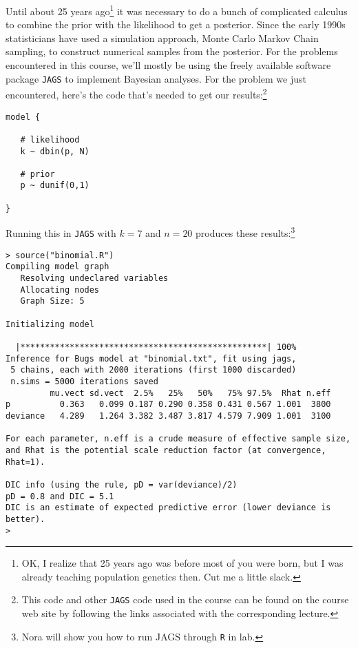 Until about 25 years ago\footnote{OK, I realize that 25 years ago was
  before most of you were born, but I was already teaching population
  genetics then. Cut me a little slack.} it was necessary to do a
bunch of complicated calculus to combine the prior with the likelihood
to get a posterior. Since the early 1990s statisticians have used a
simulation approach, Monte Carlo Markov Chain sampling, to construct
numerical samples from the posterior. For the problems encountered in
this course, we'll mostly be using the freely available software
package {\tt JAGS} to implement Bayesian analyses. For the problem
we just encountered, here's the code that's needed to get our
results:\footnote{This code and other {\tt JAGS} code used in the
  course can be found on the course web site by following the links
  associated with the corresponding
  lecture.}
\begin{verbatim}
model {

   # likelihood
   k ~ dbin(p, N)

   # prior
   p ~ dunif(0,1)

}
\end{verbatim}
Running this in {\tt JAGS} with $k=7$ and $n=20$ produces these
results:\footnote{Nora will show you how to run JAGS through {\tt R}
  in lab.}
\begin{verbatim}
> source("binomial.R")
Compiling model graph
   Resolving undeclared variables
   Allocating nodes
   Graph Size: 5

Initializing model

  |**************************************************| 100%
Inference for Bugs model at "binomial.txt", fit using jags,
 5 chains, each with 2000 iterations (first 1000 discarded)
 n.sims = 5000 iterations saved
         mu.vect sd.vect  2.5%   25%   50%   75% 97.5%  Rhat n.eff
p          0.363   0.099 0.187 0.290 0.358 0.431 0.567 1.001  3800
deviance   4.289   1.264 3.382 3.487 3.817 4.579 7.909 1.001  3100

For each parameter, n.eff is a crude measure of effective sample size,
and Rhat is the potential scale reduction factor (at convergence, Rhat=1).

DIC info (using the rule, pD = var(deviance)/2)
pD = 0.8 and DIC = 5.1
DIC is an estimate of expected predictive error (lower deviance is better).
>
\end{verbatim}


